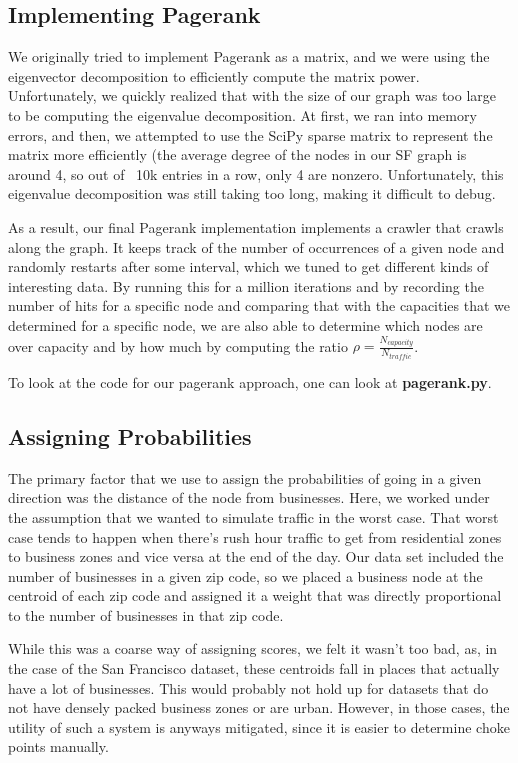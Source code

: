 \documentclass{article}
\begin{document}
\subsection{Implementing Pagerank}
We originally tried to implement Pagerank as a matrix, and we were using the eigenvector decomposition to efficiently compute the matrix power. Unfortunately, we quickly realized that with the size of our graph was too large to be computing the eigenvalue decomposition. At first, we ran into memory errors, and then, we attempted to use the SciPy sparse matrix to represent the matrix more efficiently (the average degree of the nodes in our SF graph is around 4, so out of ~10k entries in a row, only 4 are nonzero. Unfortunately, this eigenvalue decomposition was still taking too long, making it difficult to debug.

As a result, our final Pagerank implementation implements a crawler that crawls along the graph. It keeps track of the number of occurrences of a given node and randomly restarts after some interval, which we tuned to get different kinds of interesting data. By running this for a million iterations and by recording the number of hits for a specific node and comparing that with the capacities that we determined for a specific node, we are also able to determine which nodes are over capacity and by how much by computing the ratio $\rho = \frac{N_{capacity}}{N_{traffic}}$. 

To look at the code for our pagerank approach, one can look at \textbf{pagerank.py}.

\subsection{Assigning Probabilities}
The primary factor that we use to assign the probabilities of going in a given direction was the distance of the node from businesses. Here, we worked under the assumption that we wanted to simulate traffic in the worst case. That worst case tends to happen when there's rush hour traffic to get from residential zones to business zones and vice versa at the end of the day. Our data set included the number of businesses in a given zip code, so we placed a business node at the centroid of each zip code and assigned it a weight that was directly proportional to the number of businesses in that zip code. 

While this was a coarse way of assigning scores, we felt it wasn't too bad, as, in the case of the San Francisco dataset, these centroids fall in places that actually have a lot of businesses. This would probably not hold up for datasets that do not have densely packed business zones or are urban. However, in those cases, the utility of such a system is anyways mitigated, since it is easier to determine choke points manually. 
\end{document}
